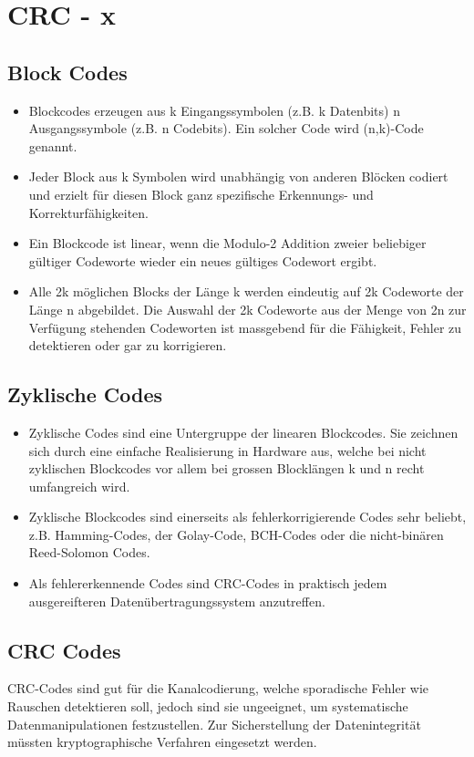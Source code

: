 \section{CRC - x}


\subsection{Block Codes}

\begin{itemize}
	\item	Blockcodes erzeugen aus k Eingangssymbolen (z.B. k Datenbits) n Ausgangssymbole (z.B. n Codebits). Ein solcher Code wird (n,k)-Code genannt.	
	\item Jeder Block aus k Symbolen wird unabhängig von anderen Blöcken codiert und erzielt für diesen Block ganz spezifische Erkennungs- und Korrekturfähigkeiten.
	\item Ein Blockcode ist linear, wenn die Modulo-2 Addition zweier beliebiger gültiger Codeworte wieder ein neues gültiges Codewort ergibt.
	\item Alle 2k möglichen Blocks der Länge k werden eindeutig auf 2k Codeworte der Länge n abgebildet. Die Auswahl der 2k Codeworte aus der Menge von 2n zur Verfügung stehenden Codeworten ist massgebend für die Fähigkeit, Fehler zu detektieren oder gar zu korrigieren.
\end{itemize}


\subsection{Zyklische Codes}
\begin{itemize}
	\item Zyklische Codes sind eine Untergruppe der linearen Blockcodes. Sie zeichnen sich durch eine einfache Realisierung in Hardware aus, welche bei nicht zyklischen Blockcodes vor allem bei grossen Blocklängen k und n recht umfangreich wird.
	\item Zyklische Blockcodes sind einerseits als fehlerkorrigierende Codes sehr beliebt, z.B. Hamming-Codes, der Golay-Code, BCH-Codes oder die nicht-binären Reed-Solomon Codes.
	\item Als fehlererkennende Codes sind CRC-Codes in praktisch jedem ausgereifteren
	Datenübertragungssystem anzutreffen.	
\end{itemize}

\subsection{CRC Codes}
CRC-Codes sind gut für die Kanalcodierung, welche sporadische Fehler wie Rauschen detektieren soll, jedoch sind sie ungeeignet, um systematische Datenmanipulationen festzustellen. Zur Sicherstellung der Datenintegrität müssten kryptographische Verfahren eingesetzt werden.

